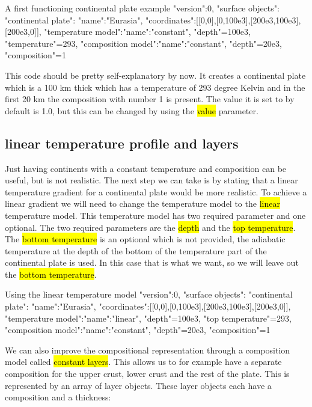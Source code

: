 \documentclass{book}
\begin{document}
\begin{bashcode}{A first functioning continental plate example}
"version":0,
"surface objects":
{
  "continental plate":
  {
    "name":"Eurasia",
    "coordinates":[[0,0],[0,100e3],[200e3,100e3],[200e3,0]],
    "temperature model":{"name":"constant", "depth"=100e3, "temperature"=293},
    "composition model":{"name":"constant", "depth"=20e3, "composition"=1}
  }
}
\end{bashcode}

This code should be pretty self-explanatory by now. It creates a continental plate which is a 100 km thick which has a temperature of 293 degree Kelvin and in the first 20 km the composition with number 1 is present. The value it is set to by default is 1.0, but this can be changed by using the \hl{value} parameter.
\subsection{linear temperature profile and layers}
Just having continents with a constant temperature and composition can be useful, but is not realistic. The next step we can take is by stating that a linear temperature gradient for a continental plate would be more realistic. To achieve a linear gradient we will need to change the temperature model to the \hl{linear} temperature model. This temperature model has two required parameter and one optional. The two required parameters are the \hl{depth} and the \hl{top temperature}. The \hl{bottom temperature} is an optional which is not provided, the adiabatic temperature at the depth of the bottom of the temperature part of the continental plate is used. In this case that is what we want, so we will leave out the \hl{bottom temperature}.

\begin{bashcode}{Using the linear temperature model}
"version":0,
"surface objects":
{
  "continental plate":
  {
    "name":"Eurasia",
    "coordinates":[[0,0],[0,100e3],[200e3,100e3],[200e3,0]],
    "temperature model":{"name":"linear", "depth"=100e3, "top temperature"=293},
    "composition model":{"name":"constant", "depth"=20e3, "composition"=1}
  }
}
\end{bashcode}

We can also improve the compositional representation through a composition model called \hl{constant layers}. This allows us to for example have a separate composition for the upper crust, lower crust and the rest of the plate. This is represented by an array of layer objects. These layer objects each have a composition and a thickness:
\end{document}
